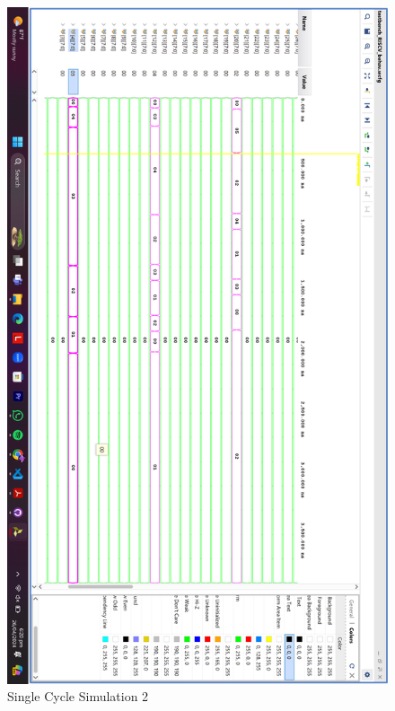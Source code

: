 \documentclass{report}
\begin{document}
\begin{figure}[h]
    \centerline{\includegraphics[scale = 0.2]{SingleCycle2.png}}
    \caption{Single Cycle Simulation 2}
\end{figure}
\end{document}
